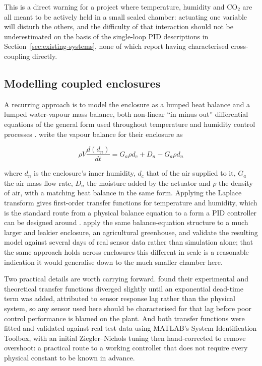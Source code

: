 This is a direct warning for a project where temperature, humidity and CO$_2$ are all meant to be actively held in a small sealed chamber: actuating one variable will disturb the others, and the difficulty of that interaction should not be underestimated on the basis of the single-loop PID descriptions in Section~\ref{sec:existing-systems}, none of which report having characterised cross-coupling directly.

\subsection{Modelling coupled enclosures}
\label{subsec:modelling-enclosures}

A recurring approach is to model the enclosure as a lumped heat balance and a lumped water-vapour mass balance, both non-linear ``in minus out'' differential equations of the general form used throughout temperature and humidity control processes \citep{buonomano_temperature_2017,kapen_energy_2019}. \citet{matamoros_temperature_2020} write the vapour balance for their enclosure as

\begin{equation}
\rho V \frac{d(d_n)}{dt} = G_a \rho d_c + D_n - G_a \rho d_n
\label{eq:water-balance}
\end{equation}

where $d_n$ is the enclosure's inner humidity, $d_c$ that of the air supplied to it, $G_a$ the air mass flow rate, $D_n$ the moisture added by the actuator and $\rho$ the density of air, with a matching heat balance in the same form. Applying the Laplace transform gives first-order transfer functions for temperature and humidity, which is the standard route from a physical balance equation to a form a PID controller can be designed around \citep{matamoros_temperature_2020}. \citet{riahi_intelligent_2020} apply the same balance-equation structure to a much larger and leakier enclosure, an agricultural greenhouse, and validate the resulting model against several days of real sensor data rather than simulation alone; that the same approach holds across enclosures this different in scale is a reasonable indication it would generalise down to the much smaller chamber here.

Two practical details are worth carrying forward. \citet{matamoros_temperature_2020} found their experimental and theoretical transfer functions diverged slightly until an exponential dead-time term was added, attributed to sensor response lag rather than the physical system, so any sensor used here should be characterised for that lag before poor control performance is blamed on the plant. And both transfer functions were fitted and validated against real test data using MATLAB's System Identification Toolbox, with an initial Ziegler--Nichols tuning then hand-corrected to remove overshoot: a practical route to a working controller that does not require every physical constant to be known in advance.

